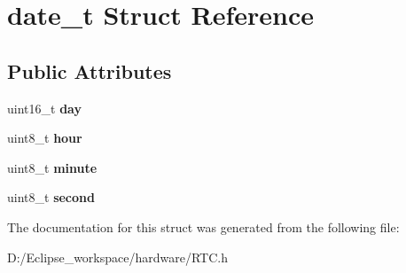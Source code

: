 \hypertarget{structdate__t}{}\section{date\+\_\+t Struct Reference}
\label{structdate__t}
\subsection*{Public Attributes}
\begin{DoxyCompactItemize}
\item 
\hypertarget{structdate__t_a86e4a92fa9575daedcf85137c74eb5b2}{}uint16\+\_\+t {\bfseries day}\label{structdate__t_a86e4a92fa9575daedcf85137c74eb5b2}

\item 
\hypertarget{structdate__t_ac04c2156faeae76a9cce999c4cf9a033}{}uint8\+\_\+t {\bfseries hour}\label{structdate__t_ac04c2156faeae76a9cce999c4cf9a033}

\item 
\hypertarget{structdate__t_a7d8c9b40463fd668c627e91d4ba4b950}{}uint8\+\_\+t {\bfseries minute}\label{structdate__t_a7d8c9b40463fd668c627e91d4ba4b950}

\item 
\hypertarget{structdate__t_a0cb1551e6d34db3640222dbedc058309}{}uint8\+\_\+t {\bfseries second}\label{structdate__t_a0cb1551e6d34db3640222dbedc058309}

\end{DoxyCompactItemize}


The documentation for this struct was generated from the following file\+:\begin{DoxyCompactItemize}
\item 
D\+:/\+Eclipse\+\_\+workspace/hardware/R\+T\+C.\+h\end{DoxyCompactItemize}
